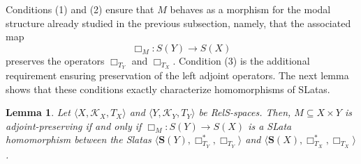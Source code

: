 \documentclass{article}
\newtheorem{lemma}{\bf Lemma}[section]
\begin{document}
Conditions (1) and (2) ensure that $M$ behaves as a morphism for the modal structure already studied in the previous subsection, namely, that the associated map
\[
\Box_M:S(Y)\to S(X)
\]
preserves the operators $\Box_{T_Y}$ and $\Box_{T_X}$.
Condition (3) is the additional requirement ensuring preservation of the left adjoint operators. The next lemma shows that these conditions exactly characterize homomorphisms of SLatas.

\begin{lemma}\label{funtor morfirmo M}
Let $\langle X, \mathcal{K}_X, T_X \rangle$ and $\langle Y, \mathcal{K}_Y, T_Y \rangle$ be RelS-spaces. Then,  $M\subseteq X\times Y$ is adjoint-preserving if and only if $\Box_{M}:S(Y)\to S(X)$ is a SLata homomorphism between the Slatas $\langle \mathbf{S}(Y), \Box_{T_{Y}}^{\ast}, \Box_{T_{Y}}\rangle$ and $\langle \mathbf{S}(X), \Box_{T_{X}}^{\ast}, \Box_{T_{X}}\rangle$.
\end{lemma}
\end{document}
